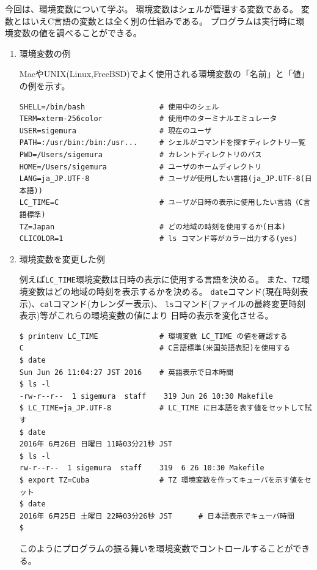 \documentclass[a4j,dvipdfmx]{jarticle}
\begin{document}
\def\lstlistingname{リスト}


今回は、環境変数について学ぶ。
環境変数はシェルが管理する変数である。
変数とはいえC言語の変数とは全く別の仕組みである。
プログラムは実行時に環境変数の値を調べることができる。

\begin{enumerate}
\item 環境変数の例

MacやUNIX(Linux,FreeBSD)でよく使用される環境変数の「名前」と「値」の例を示す。
\begin{lstlisting}[numbers=none]
SHELL=/bin/bash                 # 使用中のシェル
TERM=xterm-256color             # 使用中のターミナルエミュレータ
USER=sigemura                   # 現在のユーザ
PATH=:/usr/bin:/bin:/usr...     # シェルがコマンドを探すディレクトリ一覧
PWD=/Users/sigemura             # カレントディレクトリのパス
HOME=/Users/sigemura            # ユーザのホームディレクトリ
LANG=ja_JP.UTF-8                # ユーザが使用したい言語(ja_JP.UTF-8(日本語))
LC_TIME=C                       # ユーザが日時の表示に使用したい言語（C言語標準)
TZ=Japan                        # どの地域の時刻を使用するか(日本)
CLICOLOR=1                      # ls コマンド等がカラー出力する(yes)
\end{lstlisting}

\item 環境変数を変更した例

例えば\verb/LC_TIME/環境変数は日時の表示に使用する言語を決める。
また、\verb/TZ/環境変数はどの地域の時刻を表示するかを決める。
\verb/date/コマンド(現在時刻表示)、\verb/cal/コマンド(カレンダー表示)、
\verb/ls/コマンド(ファイルの最終変更時刻表示)等がこれらの環境変数の値により
日時の表示を変化させる。
\begin{lstlisting}[numbers=none]
$ printenv LC_TIME              # 環境変数 LC_TIME の値を確認する
C                               # C言語標準(米国英語表記)を使用する
$ date
Sun Jun 26 11:04:27 JST 2016    # 英語表示で日本時間
$ ls -l
-rw-r--r--  1 sigemura  staff    319 Jun 26 10:30 Makefile
$ LC_TIME=ja_JP.UTF-8           # LC_TIME に日本語を表す値をセットして試す
$ date
2016年 6月26日 日曜日 11時03分21秒 JST
$ ls -l
rw-r--r--  1 sigemura  staff    319  6 26 10:30 Makefile
$ export TZ=Cuba                # TZ 環境変数を作ってキューバを示す値をセット
$ date
2016年 6月25日 土曜日 22時03分26秒 JST      # 日本語表示でキューバ時間
$
\end{lstlisting}
このようにプログラムの振る舞いを環境変数でコントロールすることができる。


\end{enumerate}
\end{document}
